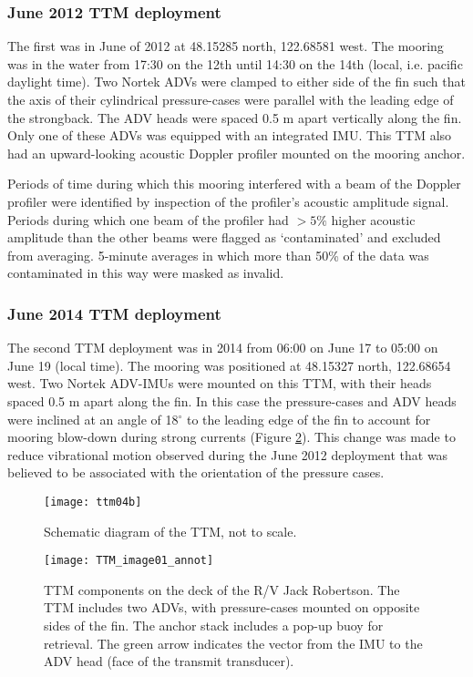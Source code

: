 \subsubsection{June 2012 TTM deployment}

The first was in June of 2012 at 48.15285 north, 122.68581 west. The mooring was in the water from 17:30 on the 12th until 14:30 on the 14th (local, i.e. pacific daylight time). Two Nortek ADVs were clamped to either side of the fin such that the axis of their cylindrical pressure-cases were parallel with the leading edge of the strongback. The ADV heads were spaced 0.5 m apart vertically along the fin. Only one of these ADVs was equipped with an integrated IMU. This TTM also had an upward-looking acoustic Doppler profiler mounted on the mooring anchor.

Periods of time during which this mooring interfered with a beam of the Doppler profiler were identified by inspection of the profiler's acoustic amplitude signal. Periods during which one beam of the profiler had $>5\%$ higher acoustic amplitude than the other beams were flagged as `contaminated' and excluded from averaging.  5-minute averages in which more than 50\% of the data was contaminated in this way were masked as invalid.

\subsubsection{June 2014 TTM deployment}

The second TTM deployment was in 2014 from 06:00 on June 17 to 05:00 on June 19 (local time). The mooring was positioned at 48.15327 north, 122.68654 west.  Two Nortek ADV-IMUs were mounted on this TTM, with their heads spaced 0.5 m apart along the fin. In this case the pressure-cases and ADV heads were inclined at an angle of 18$^\circ$ to the leading edge of the fin to account for mooring blow-down during strong currents (Figure \ref{fig:ttm:photo}). This change was made to reduce vibrational motion observed during the June 2012 deployment that was believed to be associated with the orientation of the pressure cases.

\begin{figure}[t]
  \centering
  \texttt{[image: ttm04b]}
  \caption{Schematic diagram of the TTM, not to scale.}
  \label{fig:ttm:diagram}
\end{figure}

\begin{figure}[t]
  \centering
  \texttt{[image: TTM\_image01\_annot]}
  \caption{TTM components on the deck of the R/V Jack Robertson. The TTM includes two ADVs, with pressure-cases mounted on opposite sides of the fin. The anchor stack includes a pop-up buoy for retrieval. The green arrow indicates the vector from the IMU to the ADV head (face of the transmit transducer). }
  \label{fig:ttm:photo}
\end{figure}


